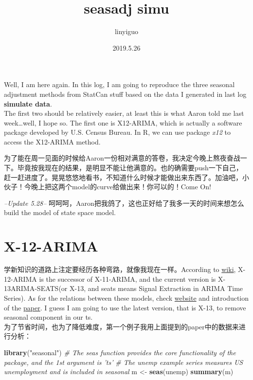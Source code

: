 \documentclass[]{article}
\title{seasadj simu}
\author{linyiguo}
\date{2019.5.26}
\newenvironment{Shaded}{\begin{snugshade}}{\end{snugshade}}
\newcommand{\CommentTok}[1]{\textcolor[rgb]{0.56,0.35,0.01}{\textit{#1}}}
\newcommand{\KeywordTok}[1]{\textcolor[rgb]{0.13,0.29,0.53}{\textbf{#1}}}
\newcommand{\NormalTok}[1]{#1}
\newcommand{\StringTok}[1]{\textcolor[rgb]{0.31,0.60,0.02}{#1}}
\begin{document}
\maketitle

Well, I am here again. In this log, I am going to reproduce the three
seasonal adjustment methods from StatCan stuff based on the data I
generated in last log \textbf{simulate data}.\\
The first two should be relatively easier, at least this is what Aaron
told me last week\ldots{}well, I hope so. The first one is X12-ARIMA,
which is actually a software package developed by U.S. Census Bureau. In
R, we can use package \emph{x12} to access the X12-ARIMA method.

为了能在周一见面的时候给Aaron一份相对满意的答卷，我决定今晚上熬夜奋战一下。毕竟按我现在的结果，是明显不能让他满意的。也的确需要push一下自己，赶一赶进度了。晃晃悠悠地看书，不知道什么时候才能做出来东西了。加油吧，小伙子！今晚上把这两个model的curve给做出来！你可以的！Come
On!

\emph{--Update 5.28--}
呵呵呵，Aaron把我鸽了，这也正好给了我多一天的时间来想怎么build the model
of state space model.

\hypertarget{x-12-arima}{%
\section{X-12-ARIMA}\label{x-12-arima}}

学新知识的道路上注定要经历各种弯路，就像我现在一样。According to
\href{https://en.wikipedia.org/wiki/X-12-ARIMA}{wiki}, X-12-ARIMA is the
successor of X-11-ARIMA, and the current version is X-13ARIMA-SEATS(or
X-13, and seats means Signal Extraction in ARIMA Time Series). As for
the relations between these models, check
\href{https://www.r-bloggers.com/seasonal-adjusment-on-the-fly-with-x-13arima-seats-seasonal-and-ggplot2/}{website}
and introduction of the
\href{https://cran.r-project.org/web/packages/seasonal/vignettes/seas.pdf}{paper}.
I guess I am going to use the latest version, that is X-13, to remove
seasonal component in our ts.\\
为了节省时间，也为了降低难度，第一个例子我用上面提到的paper中的数据来进行分析：

\begin{Shaded}
\begin{Highlighting}[]
\KeywordTok{library}\NormalTok{(}\StringTok{"seasonal"}\NormalTok{)}
\CommentTok{# The seas function provides the core functionality of the package, and the 1st argument is 'ts'}
\CommentTok{# The unemp example series measures US unemployment and is included in seasonal}
\NormalTok{m <-}\StringTok{ }\KeywordTok{seas}\NormalTok{(unemp)}
\KeywordTok{summary}\NormalTok{(m)}
\end{Highlighting}
\end{Shaded}
\end{document}
